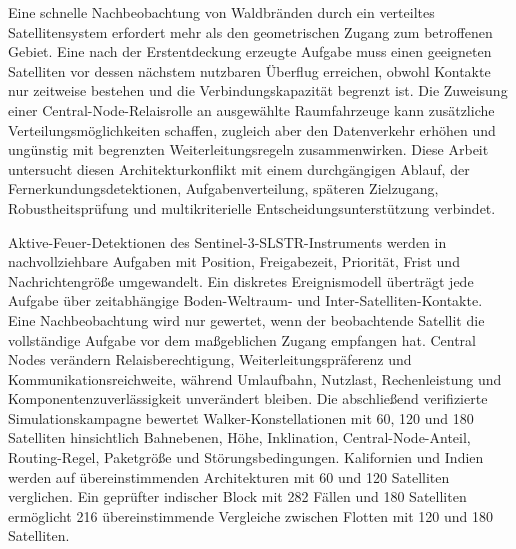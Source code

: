 Eine schnelle Nachbeobachtung von Waldbränden durch ein verteiltes Satellitensystem erfordert mehr als den geometrischen Zugang zum betroffenen Gebiet. Eine nach der Erstentdeckung erzeugte Aufgabe muss einen geeigneten Satelliten vor dessen nächstem nutzbaren Überflug erreichen, obwohl Kontakte nur zeitweise bestehen und die Verbindungskapazität begrenzt ist. Die Zuweisung einer Central-Node-Relaisrolle an ausgewählte Raumfahrzeuge kann zusätzliche Verteilungsmöglichkeiten schaffen, zugleich aber den Datenverkehr erhöhen und ungünstig mit begrenzten Weiterleitungsregeln zusammenwirken. Diese Arbeit untersucht diesen Architekturkonflikt mit einem durchgängigen Ablauf, der Fernerkundungsdetektionen, Aufgabenverteilung, späteren Zielzugang, Robustheitsprüfung und multikriterielle Entscheidungsunterstützung verbindet.

Aktive-Feuer-Detektionen des Sentinel-3-SLSTR-Instruments werden in nachvollziehbare Aufgaben mit Position, Freigabezeit, Priorität, Frist und Nachrichtengröße umgewandelt. Ein diskretes Ereignismodell überträgt jede Aufgabe über zeitabhängige Boden-Weltraum- und Inter-Satelliten-Kontakte. Eine Nachbeobachtung wird nur gewertet, wenn der beobachtende Satellit die vollständige Aufgabe vor dem maßgeblichen Zugang empfangen hat. Central Nodes verändern Relaisberechtigung, Weiterleitungspräferenz und Kommunikationsreichweite, während Umlaufbahn, Nutzlast, Rechenleistung und Komponentenzuverlässigkeit unverändert bleiben. Die abschließend verifizierte Simulationskampagne bewertet Walker-Konstellationen mit 60, 120 und 180 Satelliten hinsichtlich Bahnebenen, Höhe, Inklination, Central-Node-Anteil, Routing-Regel, Paketgröße und Störungsbedingungen. Kalifornien und Indien werden auf übereinstimmenden Architekturen mit 60 und 120 Satelliten verglichen. Ein geprüfter indischer Block mit 282 Fällen und 180 Satelliten ermöglicht 216 übereinstimmende Vergleiche zwischen Flotten mit 120 und 180 Satelliten.

